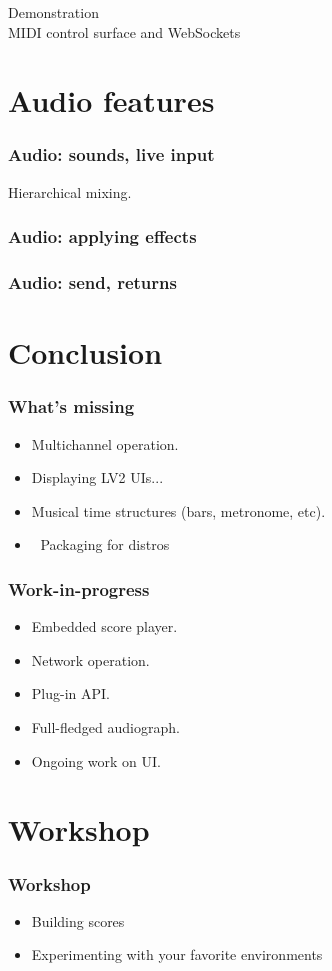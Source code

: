 \documentclass[handout]{beamer}
\begin{document}
\begin{frame}
\centering
\Huge Demonstration
~\\
\Large MIDI control surface and WebSockets
\end{frame}

\section{Audio features}
\begin{frame}
\frametitle{Audio: sounds, live input}
\Large
Hierarchical mixing.
\end{frame}

\begin{frame}
\frametitle{Audio: applying effects}
\Large
\end{frame}

\begin{frame}
\frametitle{Audio: send, returns}
\Large
\end{frame}

\section{Conclusion}

\begin{frame}
\frametitle{What's missing}
\Large
\begin{itemize}
    \item<1> Multichannel operation.
    \item<2> Displaying LV2 UIs...
    \item<3> Musical time structures (bars, metronome, etc).
    \item<4> {\Huge \setsansfont{Symbola} 🙏} Packaging for distros {\Huge \setsansfont{Symbola} 🙏}
\end{itemize}
\end{frame}

\begin{frame}
\frametitle{Work-in-progress}
\Large
\begin{itemize}
    \item<1> Embedded score player.
    \item<2> Network operation.
    \item<3> Plug-in API.
    \item<4> Full-fledged audiograph.
    \item<5> Ongoing work on UI.
\end{itemize}
\end{frame}

\section{Workshop}

\begin{frame}
\frametitle{Workshop}
\begin{itemize}
    \item Building scores
    \item Experimenting with your favorite environments
\end{itemize}
\end{frame}
\end{document}

